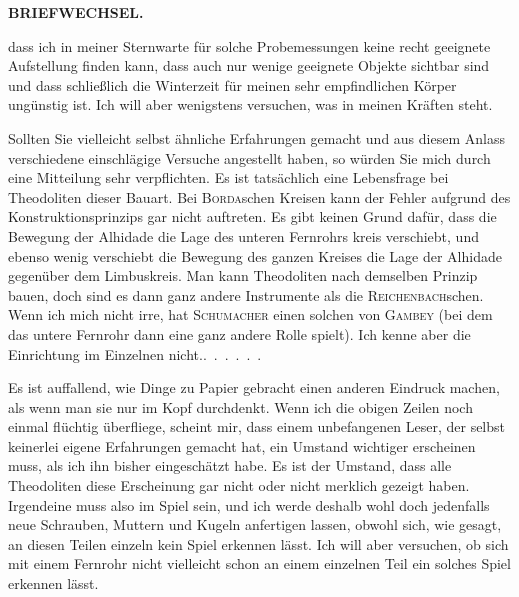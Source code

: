 \par\clearpage
\noindent{}\hfill{\small\textbf{BRIEFWECHSEL.}}\hfill\null\par\medskip
\noindent dass ich in meiner Sternwarte für solche Probemessungen keine recht geeignete Aufstellung finden kann, dass auch nur wenige geeignete Objekte sichtbar sind und dass schließlich die Winterzeit für meinen sehr empfindlichen Körper ungünstig ist. Ich will aber wenigstens versuchen, was in meinen Kräften steht.

\par\noindent\hspace*{\parindent}Sollten Sie vielleicht selbst ähnliche Erfahrungen gemacht und aus diesem Anlass verschiedene einschlägige Versuche angestellt haben, so würden Sie mich durch eine Mitteilung sehr verpflichten. Es ist tatsächlich eine Lebensfrage bei Theodoliten dieser Bauart. Bei \textsc{Borda}schen Kreisen kann der Fehler aufgrund des Konstruktionsprinzips gar nicht auftreten. Es gibt keinen Grund dafür, dass die Bewegung der Alhidade die Lage des unteren Fernrohrs kreis verschiebt, und ebenso wenig verschiebt die Bewegung des ganzen Kreises die Lage der Alhidade gegenüber dem Limbuskreis. Man kann Theodoliten nach demselben Prinzip bauen, doch sind es dann ganz andere Instrumente als die \textsc{Reichenbach}schen. Wenn ich mich nicht irre, hat \textsc{Schumacher} einen solchen von \textsc{Gambey} (bei dem das untere Fernrohr dann eine ganz andere Rolle spielt). Ich kenne aber die Einrichtung im Einzelnen nicht.\enspace .\ .\ .\ .\ .\ .

\par\noindent\hspace*{\parindent}Es ist auffallend, wie Dinge zu Papier gebracht einen anderen Eindruck machen, als wenn man sie nur im Kopf durchdenkt. Wenn ich die obigen Zeilen noch einmal flüchtig überfliege, scheint mir, dass einem unbefangenen Leser, der selbst keinerlei eigene Erfahrungen gemacht hat, ein Umstand wichtiger erscheinen muss, als ich ihn bisher eingeschätzt habe. Es ist der Umstand, dass alle Theodoliten  diese Erscheinung gar nicht oder nicht merklich gezeigt haben. Irgendeine  muss also im Spiel sein, und ich werde deshalb wohl doch jedenfalls neue Schrauben, Muttern und Kugeln anfertigen lassen, obwohl sich, wie gesagt, an diesen Teilen einzeln kein Spiel erkennen lässt. Ich will aber versuchen, ob sich mit einem  Fernrohr nicht vielleicht schon an einem einzelnen Teil ein solches Spiel erkennen lässt.

